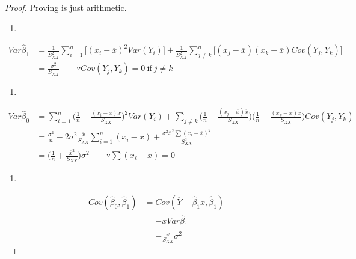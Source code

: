 \documentclass[]{book}
\theoremstyle{definition}
\theoremstyle{definition}
\theoremstyle{definition}
\theoremstyle{remark}
\let\BeginKnitrBlock\begin \let\EndKnitrBlock\end
\begin{document}
\BeginKnitrBlock{proof}
{}Proving is just arithmetic.

\begin{enumerate}
\def\labelenumi{(\alph{enumi})}
\item
\end{enumerate}

\begin{equation*}
  \begin{split}
    Var\hat\beta_1 & = \frac{1}{S_{XX}^2}\sum_{i = 1}^n \bigg[ (x_i - \overline{x})^2 Var(Y_i) \bigg] + \frac{1}{S_{XX}^2} \sum_{j \neq k}^n \bigg[ (x_j - \overline{x})(x_k - \overline{x}) Cov(Y_j, Y_k) \bigg] \\
    & = \frac{\sigma^2}{S_{XX}} \qquad \because Cov(Y_j, Y_k) = 0 \: \text{if} \: j \neq k
  \end{split}
\end{equation*}

\begin{enumerate}
\def\labelenumi{(\alph{enumi})}
\setcounter{enumi}{1}
\item
\end{enumerate}

\begin{equation*}
  \begin{split}
    Var\hat\beta_0 & = \sum_{i = 1}^n \bigg( \frac{1}{n} - \frac{(x_i - \overline{x})\overline{x}}{S_{XX}} \bigg)^2Var(Y_i) + \sum_{j \neq k} \bigg( \frac{1}{n} - \frac{(x_j - \overline{x})\overline{x}}{S_{XX}} \bigg)\bigg( \frac{1}{n} - \frac{(x_k - \overline{x})\overline{x}}{S_{XX}} \bigg) Cov(Y_j, Y_k) \\
    & = \frac{\sigma^2}{n} - 2 \sigma^2 \frac{\overline{x}}{S_{XX}} \sum_{i = 1}^n (x_i - \overline{x}) + \frac{\sigma^2 \overline{x}^2 \sum (x_i - \overline{x})^2}{S_{XX}^2} \\
    & = \bigg( \frac{1}{n} + \frac{\overline{x}^2}{S_{XX}} \bigg) \sigma^2 \qquad \because \sum (x_i - \overline{x}) = 0
  \end{split}
\end{equation*}

\begin{enumerate}
\def\labelenumi{(\alph{enumi})}
\setcounter{enumi}{2}
\item
\end{enumerate}

\begin{equation*}
  \begin{split}
    Cov(\hat\beta_0, \hat\beta_1) & = Cov(\overline{Y} - \hat\beta_1 \overline{x}, \hat\beta_1) \\
    & = - \overline{x} Var\hat\beta_1 \\
    & = - \frac{\overline{x}}{S_{XX}} \sigma^2
  \end{split}
\end{equation*}
\EndKnitrBlock{proof}
\end{document}
